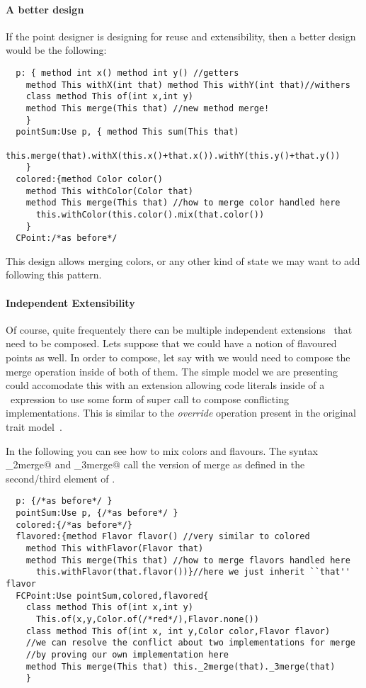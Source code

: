 \paragraph{A better design}
If the point designer is designing for reuse and extensibility, then 
a better design would be the following:  
\saveSpace\begin{lstlisting}
  p: { method int x() method int y() //getters
    method This withX(int that) method This withY(int that)//withers
    class method This of(int x,int y)
    method This merge(This that) //new method merge!
    }
  pointSum:Use p, { method This sum(This that)
      this.merge(that).withX(this.x()+that.x()).withY(this.y()+that.y())
    }
  colored:{method Color color()
    method This withColor(Color that)
    method This merge(This that) //how to merge color handled here
      this.withColor(this.color().mix(that.color())
    }
  CPoint:/*as before*/
\end{lstlisting}  \saveSpace
  \noindent This design allows merging colors, or any other kind of state we may want to add
  following this pattern.%

\paragraph{Independent Extensibility}
  Of course, quite frequentely there can be multiple independent
  extensions~\cite{Zenger-Odersky2005} that need to be composed. Lets suppose that 
  we could have a notion of flavoured points as well.   
  In order to compose, let say \Q@colored@ with \Q@flavored@ we would
  need to compose the merge operation inside of both of them.
  The simple model we are presenting could accomodate this with an
  extension allowing code literals inside of a \use\ expression to use some form of super call to compose conflicting implementations. This is similar to the \emph{override} operation present in the original trait model~\cite{ducasse2006traits}.

In the following you can see how to mix colors and flavours. The syntax \Q@_2merge@ and   \Q@_3merge@
call the version of merge as defined in the second/third element of \use.
\saveSpace\begin{lstlisting}
  p: {/*as before*/ }
  pointSum:Use p, {/*as before*/ }
  colored:{/*as before*/}
  flavored:{method Flavor flavor() //very similar to colored
    method This withFlavor(Flavor that)
    method This merge(This that) //how to merge flavors handled here
      this.withFlavor(that.flavor())}//here we just inherit ``that'' flavor
  FCPoint:Use pointSum,colored,flavored{
    class method This of(int x,int y)
      This.of(x,y,Color.of(/*red*/),Flavor.none())
    class method This of(int x, int y,Color color,Flavor flavor)
    //we can resolve the conflict about two implementations for merge
    //by proving our own implementation here
    method This merge(This that) this._2merge(that)._3merge(that)
    }
\end{lstlisting}  \saveSpace\saveSpace
